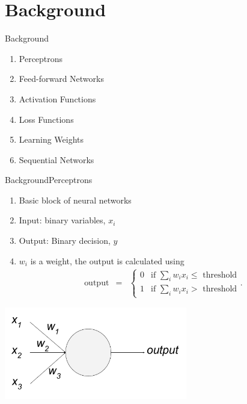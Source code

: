 \documentclass[handout]{beamer}
\begin{document}
\section{Background}
\begin{frame}{Background}
  \begin{enumerate}
    \item Perceptrons
    \item Feed-forward Networks
    \item Activation Functions
    \item Loss Functions
    \item Learning Weights
    \item Sequential Networks
  \end{enumerate}
\end{frame}

\begin{frame}{Background}{Perceptrons}
\begin{enumerate}
  \item Basic block of neural networks \\

  \item Input: binary variables, $x_i$ \\

  \item Output: Binary decision, $y$ \\

  \item $w_i$ is a weight, the output is calculated using \\

  \begin{eqnarray}
  \mbox{output} & = & \left\{ \begin{array}{ll}
      0 & \mbox{if } \sum_i w_i x_i \leq \mbox{ threshold} \\
      1 & \mbox{if } \sum_i w_i x_i > \mbox{ threshold}
      \end{array} .
\end{eqnarray}
\end{enumerate}
    \begin{center}
      \includegraphics[width=0.8\linewidth, height=4cm]{images/perceptron}
    \end{center}
\end{frame}
\end{document}
